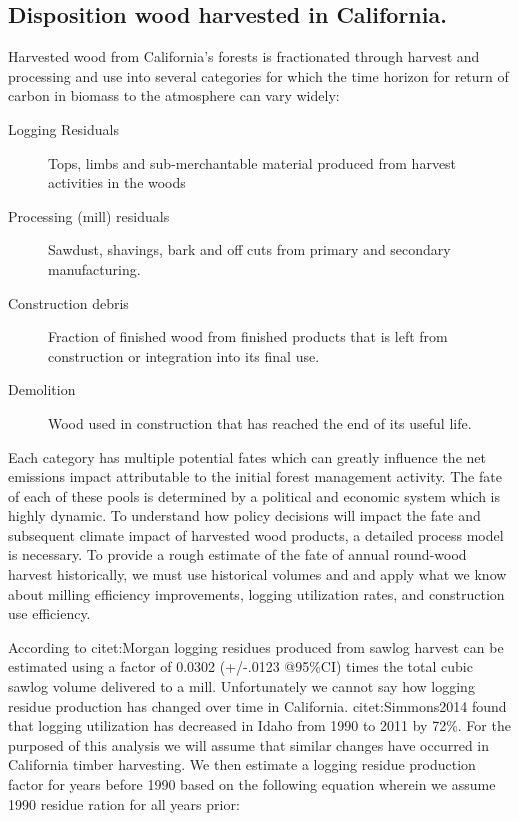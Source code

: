 \documentclass[a4paper]{article}
\begin{document}
\subsection{Disposition wood harvested in California.}
\label{sec-3-1}

Harvested wood from California's forests is fractionated through harvest and processing and use into several categories for which the time horizon for return of carbon in biomass to the atmosphere can vary widely:

\begin{description}
\item[{Logging Residuals}] Tops, limbs and sub-merchantable material produced from harvest activities in the woods
\item[{Processing (mill) residuals}] Sawdust, shavings, bark and off cuts from primary and secondary manufacturing.
\item[{Construction debris}] Fraction of finished wood from finished products that is left from construction or integration into its final use.
\item[{Demolition}] Wood used in construction that has reached the end of its useful life.
\end{description}

Each category has multiple potential fates which can greatly influence the net emissions impact attributable to the initial forest management activity.  The fate of each of these pools is determined by a political and economic system which is highly dynamic. To understand how policy decisions will impact the fate and subsequent climate impact of harvested wood products, a detailed process model is necessary. To provide a rough estimate of the fate of annual round-wood harvest historically, we must use historical volumes and and apply what we know about milling efficiency improvements, logging utilization rates, and construction use efficiency. 

According to citet:Morgan logging residues produced from sawlog harvest can be estimated using a factor of 0.0302 (+/-.0123 @95\%CI) times the total cubic sawlog volume delivered to a mill. Unfortunately we cannot say how logging residue production has changed over time in California.  citet:Simmons2014 found that logging utilization has decreased in Idaho from 1990 to 2011 by 72\%. For the purposed of this analysis we will assume that similar changes have occurred in California timber harvesting. We then estimate a logging residue production factor for years before 1990 based on the following equation wherein we assume 1990 residue ration for all years prior:
\end{document}
